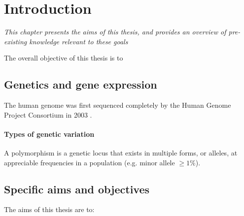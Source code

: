 \chapter{Introduction}
\label{ch:Introduction}
\textit{This chapter presents the aims of this thesis, and provides an overview of pre-existing knowledge relevant to these goals}


\startcontents[chapters]{\vspace{-1.4cm}}
\singlespacing
{}
\doublespacing
\vspace{0.5cm}

The overall objective of this thesis is to 

\section{Genetics and gene expression}

The human genome was first sequenced completely by the Human Genome Project Consortium in 2003 \parencite{Collins2003}. 

\subsubsection{Types of genetic variation}

A polymorphism is a genetic locus that exists in multiple forms, or alleles, at appreciable frequencies in a population (e.g. minor allele $\geq1\%$). 

\section{Specific aims and objectives}

The aims of this thesis are to:

